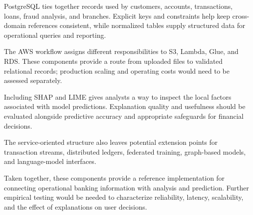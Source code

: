 \documentclass[conference]{IEEEtran}
\begin{document}
PostgreSQL ties together records used by customers, accounts, transactions, loans, fraud analysis, and branches. Explicit keys and constraints help keep cross-domain references consistent, while normalized tables supply structured data for operational queries and reporting.

The AWS workflow assigns different responsibilities to S3, Lambda, Glue, and RDS. These components provide a route from uploaded files to validated relational records; production scaling and operating costs would need to be assessed separately.

Including SHAP and LIME gives analysts a way to inspect the local factors associated with model predictions. Explanation quality and usefulness should be evaluated alongside predictive accuracy and appropriate safeguards for financial decisions.

The service-oriented structure also leaves potential extension points for transaction streams, distributed ledgers, federated training, graph-based models, and language-model interfaces.

Taken together, these components provide a reference implementation for connecting operational banking information with analysis and prediction. Further empirical testing would be needed to characterize reliability, latency, scalability, and the effect of explanations on user decisions.
\end{document}
